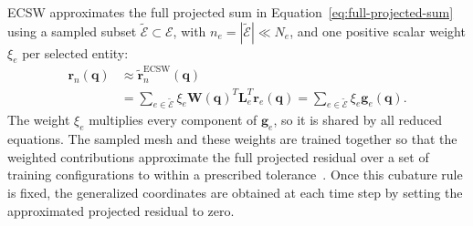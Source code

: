 \documentclass[a4paper,12pt]{article}
\newcommand{\vect}[1]{\boldsymbol{#1}}
\newcommand{\matr}[1]{\boldsymbol{#1}}
\begin{document}
ECSW approximates the full projected sum in Equation~\eqref{eq:full-projected-sum} using a sampled subset $\widetilde{\mathcal E}\subset\mathcal E$, with $n_e=|\widetilde{\mathcal E}|\ll N_e$, and one positive scalar weight $\xi_e$ per selected entity:
\begin{equation}
 \begin{aligned}
 \vect{r}_n(\vect{q})
 &\approx\widetilde{\vect{r}}_n^{\mathrm{ECSW}}(\vect{q})\\
 &=\sum_{e\in\widetilde{\mathcal E}}
      \xi_e\matr{W}(\vect{q})^T\matr{L}_e^T\vect{r}_e(\vect{q})
 =\sum_{e\in\widetilde{\mathcal E}}\xi_e\vect{g}_e(\vect{q}).
 \end{aligned}
 \label{eq:classical}
\end{equation}
The weight $\xi_e$ multiplies every component of $\vect{g}_e$, so it is shared by all reduced equations. The sampled mesh and these weights are trained together so that the weighted contributions approximate the full projected residual over a set of training configurations to within a prescribed tolerance~\cite{grimberg2021mesh}. Once this cubature rule is fixed, the generalized coordinates are obtained at each time step by setting the approximated projected residual to zero.
\end{document}
